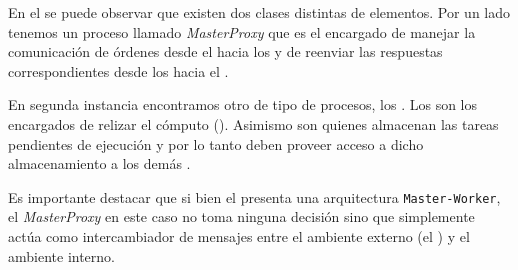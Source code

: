 \newcommand{\master}{\emph{MasterProxy}\xspace}

En el \bend se puede observar que existen dos clases distintas de elementos.
Por un lado tenemos un proceso llamado \master que es el encargado de manejar
la comunicación de órdenes desde el \fend hacia los \ws y de reenviar las
respuestas correspondientes desde los \ws hacia el \fend.

En segunda instancia encontramos otro de tipo de procesos, los \ws. Los \ws
son los encargados de relizar el cómputo (\ssolving). Asimismo son quienes
almacenan las tareas pendientes de ejecución y por lo tanto deben proveer
acceso a dicho almacenamiento a los demás \ws.

\newcommand{\masterslave}{\texttt{Master-Worker}\xspace}

Es importante destacar que si bien el \bend presenta una arquitectura
\masterslave, el \master en este caso no toma ninguna decisión sino que
simplemente actúa como intercambiador de mensajes entre el ambiente externo
(el \fend) y el ambiente interno.

\subsection{\fend}

